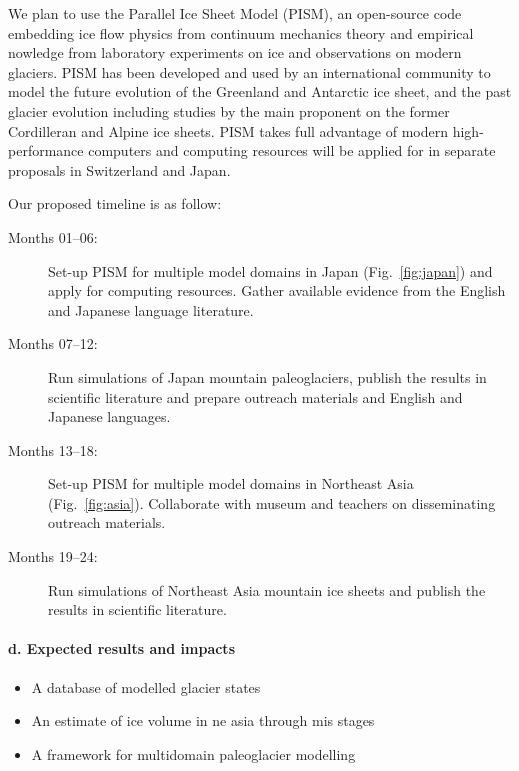 \documentclass{article}
\begin{document}
    We plan to use the Parallel Ice Sheet Model (PISM), an open-source code
    embedding ice flow physics from continuum mechanics theory and empirical
    nowledge from laboratory experiments on ice and observations on modern
    glaciers. PISM has been developed and used by an international community
    to model the future evolution of the Greenland and Antarctic ice sheet, and
    the past glacier evolution including studies by the main proponent on the
    former Cordilleran and Alpine ice sheets. PISM takes full advantage of modern
    high-performance computers and computing resources will be applied for in
    separate proposals in Switzerland and Japan.

    Our proposed timeline is as follow:
    \begin{description}
      \item[Months 01--06:]
        Set-up PISM for multiple model domains in Japan (Fig.~\ref{fig:japan})
        and apply for computing resources. Gather available evidence from the
        English and Japanese language literature.
      \item[Months 07--12:]
        Run simulations of Japan mountain paleoglaciers, publish the results in
        scientific literature and prepare outreach materials and English and
        Japanese languages.
      \item[Months 13--18:]
        Set-up PISM for multiple model domains in Northeast Asia
        (Fig.~\ref{fig:asia}). Collaborate with museum and teachers on
        disseminating outreach materials.
      \item[Months 19--24:]
        Run simulations of Northeast Asia mountain ice sheets and publish the
        results in scientific literature.
    \end{description}


\paragraph{d. Expected results and impacts}

    \begin{itemize}
      \item{A database of modelled glacier states}
      \item{An estimate of ice volume in ne asia through mis stages}
      \item{A framework for multidomain paleoglacier modelling}
    \end{itemize}
\end{document}
